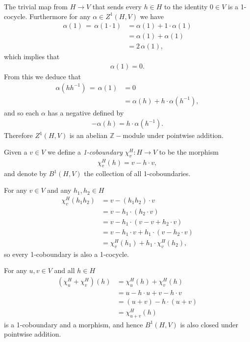 The trivial map from $H \rightarrow V$ that sends every $h \in H$ to the identity $0 \in V$ is a 1-cocycle. Furthermore for any $\alpha \in Z^1(H, V)$ we have
\begin{align*}
	\alpha(1)\, =\, \alpha(1\cdot 1) &=  \alpha(1) + 1\cdot \alpha(1) \\
	&=  \alpha(1) + \alpha(1) \\
	&=  2\,\alpha(1),
\end{align*}
which implies that
\begin{align*}
\alpha(1) = 0.
\end{align*}
From this we deduce that
\begin{align*}
	\alpha(hh^{-1})\, =\, \alpha(1) &=  0 \\
	&=  \alpha(h) + h\cdot \alpha(h^{-1}),
\end{align*}
and so each $\alpha$ has a negative defined by
\begin{align*}
	-\alpha(h) = h\cdot\alpha(h^{-1}).
\end{align*}
Therefore $Z^1\left(H, V\right)$ is an abelian $\mathbb{Z}-$module under pointwise addition.

Given a $v \in V$ we define a \emph{1-coboundary} $\chi^H_v:H\rightarrow V$ to be the morphism
\begin{align*}
	\chi^H_v (h) = v - h\cdot v,
\end{align*}
and denote by $B^1\left(H, V\right)$ the collection of all 1-coboundaries. 

For any $v \in V$ and any $h_1, h_2 \in H$
\begin{align*}
	\chi^H_v(h_1h_2) &=  v - (h_1h_2)\cdot v \\
	&=  v - h_1 \cdot \left(h_2\cdot v \right)\\
	&=  v - h_1 \cdot \left(v -v + h_2\cdot v \right)\\
	&=  v - h_1\cdot v + h_1\cdot \left( v - h_2\cdot v\right)\\
	&=  \chi^H_v(h_1) + h_1\cdot \chi^H_v(h_2),
\end{align*}
so every 1-coboundary is also a 1-cocycle.

For any $u,v \in V$ and all $h \in H$
\begin{align*}
	(\chi^H_u + \chi^H_v)(h) &=  \chi^H_u(h) + \chi^H_v(h)\\
	&=  u - h\cdot u + v - h\cdot v \\
	&=  (u + v) - h\cdot (u + v) \\
	&=  \chi^H_{u + v} (h)
\end{align*}
is a 1-coboundary and a morphism, and hence $B^1\left(H, V\right)$ is also closed under pointwise addition.

